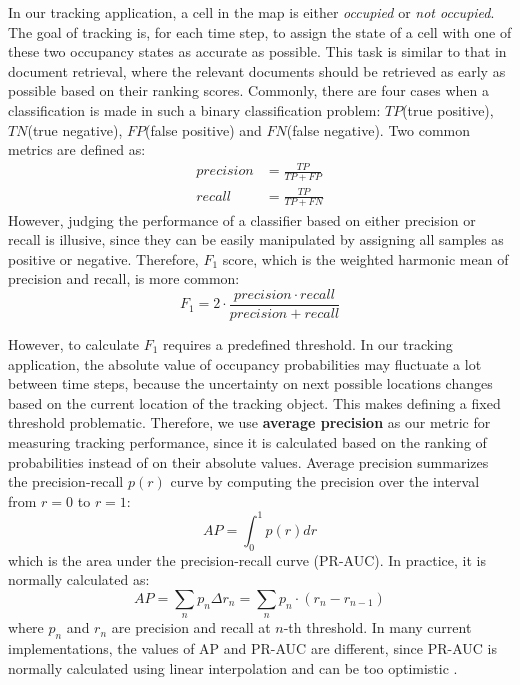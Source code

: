 In our tracking application, a cell in the map is either \textit{occupied} or \textit{not occupied}. The goal of tracking is, for each time step, to assign the state of a cell with one of these two occupancy states as accurate as possible. This task is similar to that in document retrieval, where the relevant documents should be retrieved as early as possible based on their ranking scores. Commonly, there are four cases when a classification is made in such a binary classification problem: $TP$(true positive), $TN$(true negative), $FP$(false positive) and $FN$(false negative). Two common metrics are defined as:
\begin{align}
precision &= \frac{TP}{TP+FP} \\
recall &= \frac{TP}{TP+FN}
\end{align} 
However, judging the performance of a classifier based on  either precision or recall is illusive, since they can be easily manipulated by assigning all samples as positive or negative. Therefore, $F_1$ score, which is the weighted harmonic mean of precision and recall, is more common:
\begin{equation}
F_1 = 2\cdot\frac{ precision \cdot recall}{precision+recall}
\end{equation}

However, to calculate $F_1$ requires a predefined threshold. In our tracking application, the absolute value of occupancy probabilities may fluctuate a lot between time steps, because the uncertainty on next possible locations changes based on the current location of the tracking object. This makes defining a fixed threshold problematic. Therefore, we use \textbf{average precision} as our metric for measuring tracking performance, since it is calculated based on the ranking of probabilities instead of on their absolute values. Average precision summarizes the precision-recall $p(r)$ curve by computing the precision over the interval from $r=0$ to $r=1$:
\begin{equation}
AP = \int_0^1 p(r) dr
\end{equation}
which is the area under the precision-recall curve (PR-AUC). In practice, it is normally calculated as:
\begin{equation}
AP = \sum_n p_n\Delta r_n =\sum_n p_n \cdot (r_{n}-r_{n-1})
\end{equation} 
where $p_n$ and $r_n$ are precision and recall at $n$-th threshold. In many current implementations, the values of AP and PR-AUC are different, since PR-AUC is normally calculated using linear interpolation and can be too optimistic \cite{flach2015precision}.   

